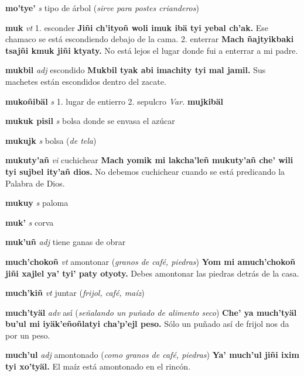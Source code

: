 \documentclass[10pt]{scrbook}
\newcommand{\entry}[1]{\textbf{#1}}
\newcommand{\onedefinition}[1]{#1.}
\newcommand{\partofspeech}[1]{\textit{#1}}
\newcommand{\spanishtranslation}[1]{#1}
\newcommand{\clarification}[1]{(\textit{#1})}
\newcommand{\cholexample}[1]{\textbf{#1}}
\newcommand{\exampletranslation}[1]{#1}
\newcommand{\variation}[1]{\textit{Var.} \textbf{#1}}
\begin{document}
\begin{multicols}{2}
\entry{mo'tye'}
\partofspeech{s}
\spanishtranslation{tipo de árbol}
\clarification{sirve para postes crianderos}

\entry{muk}
\partofspeech{vt}
\onedefinition{1}
\spanishtranslation{esconder}
\cholexample{Jiñi ch'ityoñ woli imuk ibä tyi yebal ch'ak.}
\exampletranslation{Ese chamaco se está escondiendo debajo de la cama.}
\onedefinition{2}
\spanishtranslation{enterrar}
\cholexample{Mach ñajtyikbaki tsajñi kmuk jiñi ktyaty.}
\exampletranslation{No está lejos el lugar donde fui a enterrar a mi padre.}

\entry{mukbil}
\partofspeech{adj}
\spanishtranslation{escondido}
\cholexample{Mukbil tyak abi imachity tyi mal jamil.}
\exampletranslation{Sus machetes están escondidos dentro del zacate.}

\entry{mukoñibäl}
\partofspeech{s}
\onedefinition{1}
\spanishtranslation{lugar de entierro}
\onedefinition{2}
\spanishtranslation{sepulcro}
\variation{mujkibäl}

\entry{mukuk pisil}
\partofspeech{s}
\spanishtranslation{bolsa donde se envasa el azúcar}

\entry{mukujk}
\partofspeech{s}
\spanishtranslation{bolsa}
\clarification{de tela}

\entry{mukuty'añ}
\partofspeech{vi}
\spanishtranslation{cuchichear}
\cholexample{Mach yomik mi lakcha'leñ mukuty'añ che' wili tyi sujbel ity'añ dios.}
\exampletranslation{No debemos cuchichear cuando se está predicando la Palabra de Dios.}

\entry{mukuy}
\partofspeech{s}
\spanishtranslation{paloma}

\entry{muk'}
\partofspeech{s}
\spanishtranslation{corva}

\entry{muk'uñ}
\partofspeech{adj}
\spanishtranslation{tiene ganas de obrar}

\entry{much'chokoñ}
\partofspeech{vt}
\spanishtranslation{amontonar}
\clarification{granos de café, piedras}
\cholexample{Yom mi amuch'chokoñ jiñi xajlel ya' tyi' paty otyoty.}
\exampletranslation{Debes amontonar las piedras detrás de la casa.}

\entry{much'kiñ}
\partofspeech{vt}
\spanishtranslation{juntar}
\clarification{frijol, café, maíz}

\entry{much'tyäl}
\partofspeech{adv}
\spanishtranslation{así}
\clarification{señalando un puñado de alimento seco}
\cholexample{Che' ya much'tyäl bu'ul mi iyäk'eñoñlatyi cha'p'ejl peso.}
\exampletranslation{Sólo un puñado así de frijol nos da por un peso.}

\entry{much'ul}
\partofspeech{adj}
\spanishtranslation{amontonado}
\clarification{como granos de café, piedras}
\cholexample{Ya' much'ul jiñi ixim tyi xo'tyäl.}
\exampletranslation{El maíz está amontonado en el rincón.}


\end{multicols}
\end{document}
